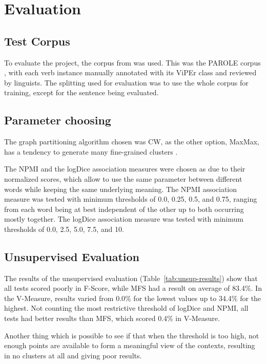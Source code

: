 \chapter{Evaluation}
\label{ch:eval}



\section{Test Corpus}

To evaluate the project, the corpus from \citep{baptista2013viper} was used. 
This was the PAROLE corpus \citep{nascimento1998parole}, with each verb 
instance manually annotated with its ViPEr class and reviewed by linguists. The 
splitting used for evaluation was to use the whole corpus for training,
except for the sentence being evaluated.

\section{Parameter choosing}

The graph partitioning algorithm chosen was \ac{CW}, as the other option,
MaxMax, has a tendency to generate many fine-grained clusters
\citep{hope2013uos}.

The \ac{NPMI} and the logDice association measures were chosen as due to their
normalized scores, which allow to use the same parameter between different words
while keeping the same underlying meaning. The \ac{NPMI} association measure 
was tested with minimum thresholds of 0.0, 0.25, 0.5, and 0.75, ranging from 
each word being at best independent of the other up to both occurring mostly 
together. The logDice association measure was tested with minimum thresholds of 
0.0, 2.5, 5.0, 7.5, and 10.

\section{Unsupervised Evaluation}

The results of the unsupervised evaluation (Table~\ref{tab:unsup-results}) show 
that all tests scored poorly in F-Score, while \ac{MFS} had a result on average 
of 83.4\%. In the V-Measure, results varied from 0.0\% for the lowest values up 
to 34.4\% for the highest. Not counting the most restrictive threshold of 
logDice and NPMI, all tests had better results than \ac{MFS}, which scored 
0.4\% in V-Measure.

Another thing which is possible to see if that when the threshold is too high,
not enough points are available to form a meaningful view of the contexts,
resulting in no clusters at all and giving poor results.

